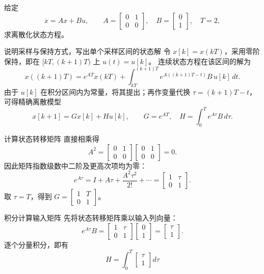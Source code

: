 \documentclass[11pt]{article}
\begin{document}
\begin{problem}[原题 16：连续系统的精确离散化]
给定
\[
\dot x=Ax+Bu,\qquad A=\begin{bmatrix}0&1\\0&0\end{bmatrix},\quad
B=\begin{bmatrix}0\\1\end{bmatrix},\quad T=2,
\]
求离散化状态方程。
\end{problem}
\begin{solution}
\begin{proofstep}{说明采样与保持方式，写出单个采样区间的状态解}
令 $x[k]=x(kT)$，采用零阶保持，即在 $[kT,(k+1)T)$ 上 $u(t)=u[k]$。
连续状态方程在该区间的解为
\[
x((k+1)T)=e^{AT}x(kT)
 +\int_{kT}^{(k+1)T}e^{A((k+1)T-t)}B\,u[k]\,dt.
\]
由于 $u[k]$ 在积分区间内为常量，将其提出；再作变量代换
$\tau=(k+1)T-t$，可得精确离散模型
\[
x[k+1]=Gx[k]+Hu[k],\qquad
G=e^{AT},\quad H=\int_0^T e^{A\tau}B\,d\tau.
\]
\end{proofstep}
\begin{proofstep}{计算状态转移矩阵}
直接相乘得
\[
A^2=\begin{bmatrix}0&1\\0&0\end{bmatrix}
\begin{bmatrix}0&1\\0&0\end{bmatrix}=0.
\]
因此矩阵指数级数中二阶及更高次项均为零：
\[
e^{A\tau}=I+A\tau+\frac{A^2\tau^2}{2!}+\cdots
=\begin{bmatrix}1&\tau\\0&1\end{bmatrix}.
\]
取 $\tau=T$，得到 $G=\begin{bmatrix}1&T\\0&1\end{bmatrix}$。
\end{proofstep}
\begin{proofstep}{积分计算输入矩阵}
先将状态转移矩阵乘以输入列向量：
\[
e^{A\tau}B=\begin{bmatrix}1&\tau\\0&1\end{bmatrix}
\begin{bmatrix}0\\1\end{bmatrix}=\begin{bmatrix}\tau\\1\end{bmatrix}.
\]
逐个分量积分，即有
\[
H=\int_0^T\begin{bmatrix}\tau\\1\end{bmatrix}d\tau
\]
\end{proofstep}
\end{solution}
\end{document}
